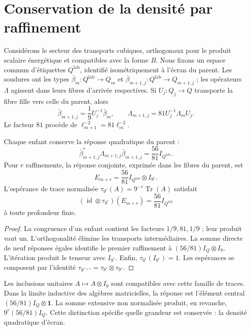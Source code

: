 \section{Conservation de la densité par raffinement}
\label{x_reciprocidad:vii:sec:densidad-refinamiento}

Considérons le secteur des transports cubiques, orthogonaux pour le produit scalaire énergétique et compatibles avec la forme \(B\). Nous fixons un espace commun d'étiquettes \(Q^{\mathrm{lab}}\), identifié isométriquement à l'écran du parent. Les soudures ont les types \(\bar\beta_m:Q^{\mathrm{lab}}\longrightarrow Q_m\) et \(\bar\beta_{m+1,j}:Q^{\mathrm{lab}}\longrightarrow Q_{m+1,j}\) ; les opérateurs \(\Lambda\) agissent dans leurs fibres d'arrivée respectives. Si \(U_j:Q_j\longrightarrow Q\) transporte la fibre fille vers celle du parent, alors
\[
 \bar\beta_{m+1,j}=\frac19U_j^{-1}\bar\beta_m,\qquad
 \Lambda_{m+1,j}=81U_j^{-1}\Lambda_mU_j.
\]
Le facteur \(81\) procède de \(\ell_{m+1}^{-2}=81\ell_m^{-2}\).

\begin{theorem}
\label{x_reciprocidad:vii:thm:densidad}
Chaque enfant conserve la réponse quadratique du parent :
\[
 \bar\beta_{m+1,j}^*\Lambda_{m+1,j}\bar\beta_{m+1,j}
 =\frac{56}{81}I_{Q^{\mathrm{lab}}}.
\]
Pour \(r\) raffinements, la réponse conjointe, exprimée dans les fibres
du parent, est
\[
 E_{m+r}=\frac{56}{81}I_{Q^{\mathrm{lab}}}\otimes I_{9^r}.
\]
L'espérance de trace normalisée
\(\tau_{9^r}(A)=9^{-r}\operatorname{Tr}(A)\) satisfait
\[
 (\operatorname{id}\otimes\tau_{9^r})(E_{m+r})
 =\frac{56}{81}I_{Q^{\mathrm{lab}}}
\]
à toute profondeur finie.
\end{theorem}

\begin{proof}
La congruence d'un enfant contient les facteurs \(1/9,81,1/9\) ;
leur produit vaut un. L'orthogonalité élimine les transports
intermédiaires. La somme directe de neuf réponses égales identifie
le premier raffinement à \((56/81)I_Q\otimes I_9\).
L'itération produit le tenseur avec \(I_{9^r}\).
Enfin, \(\tau_{9^r}(I_{9^r})=1\). Les espérances se composent
par l'identité
\(\tau_{9^{r+s}}=\tau_{9^r}\otimes\tau_{9^s}\).
\end{proof}

Les inclusions unitaires \(A\mapsto A\otimes I_9\) sont compatibles avec
cette famille de traces. Dans la limite inductive des algèbres matricielles,
la réponse est l'élément central
\((56/81)I_Q\otimes\mathbf1\). La somme extensive non normalisée produit,
en revanche, \(9^r(56/81)I_Q\). Cette distinction spécifie quelle grandeur
est conservée : la densité quadratique d'écran.

